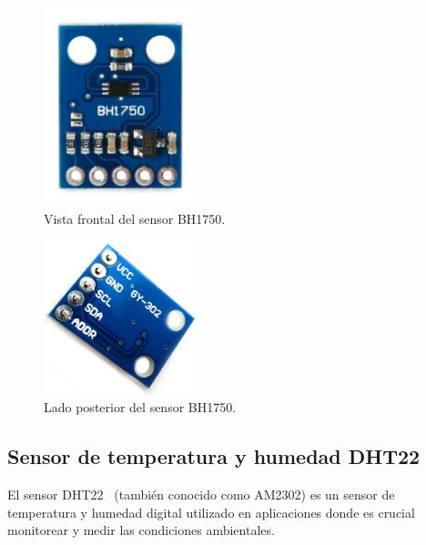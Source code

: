 \begin{figure}[h]
    \centering
    \includegraphics[width=0.4\textwidth]{img/herramientas/bh1750_cara.png}
    \caption{Vista frontal del sensor BH1750.}
\end{figure}
\pagebreak

\begin{figure}[h]
    \centering
    \includegraphics[width=0.4\textwidth]{img/herramientas/bh1750_reverso.png}
    \caption{Lado posterior del sensor BH1750.}
\end{figure}
\pagebreak

\subsection{Sensor de temperatura y humedad DHT22}
El sensor DHT22~\cite{manual:DHT22} (también conocido como AM2302) es un sensor de temperatura y humedad digital utilizado en aplicaciones donde es crucial monitorear y medir las condiciones ambientales.

